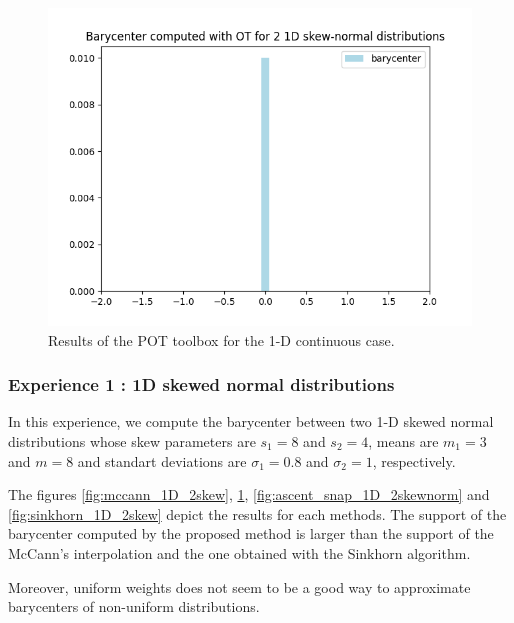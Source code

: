 \begin{figure}
    \centering
    \includegraphics[scale=.4]{figures/ot_barycenter_1D_2skewnorm.png}
    \caption{Results of the POT toolbox for the 1-D continuous case. }
    \label{fig:pot_1D_2skewnorm}
\end{figure}

\subsubsection{Experience 1 : 1D skewed normal distributions}

In this experience, we compute the barycenter between two 1-D skewed normal distributions whose skew parameters are $s_1=8$ and $s_2=4$, means are $m_1=3$ and $m=8$ and standart deviations are $\sigma_1=0.8$ and $\sigma_2=1$, respectively.  

The figures \ref{fig:mccann_1D_2skew}, \ref{fig:pot_1D_2skewnorm}, \ref{fig:ascent_snap_1D_2skewnorm} and \ref{fig:sinkhorn_1D_2skew} depict the results for each methods. The support of the barycenter computed by the proposed method is larger than the support of the McCann's interpolation and the one obtained with the Sinkhorn algorithm. 

Moreover, uniform weights does not seem to be a good way to approximate barycenters of non-uniform distributions.

